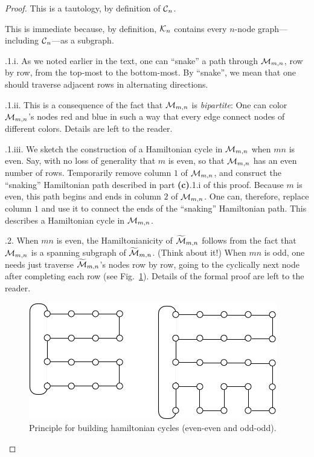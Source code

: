 \begin{proof}
This is a tautology, by definition of $\mbox{$\cal C$}_n$.

\medskip

This is immediate because, by definition, $\mbox{$\cal K$}_n$ contains every
$n$-node graph---including $\mbox{$\cal C$}_n$---as a subgraph.

\medskip

.1.i.
As we noted earlier in the text, one can ``snake'' a path through
$\mbox{$\cal M$}_{m,n}$, row by row, from the top-most to the bottom-most.  By
``snake'', we mean that one should traverse adjacent rows in
alternating directions.

.1.ii.
This is a consequence of the fact that $\mbox{$\cal M$}_{m,n}$ is {\it bipartite}:
 One can color $\mbox{$\cal M$}_{m,n}$'s nodes red and blue
in such a way that every edge connect nodes of different colors.
Details are left to the reader.

.1.iii.
We sketch the construction of a Hamiltonian cycle in $\mbox{$\cal M$}_{m,n}$ when
$mn$ is even.  Say, with no loss of generality that $m$ is even, so
that $\mbox{$\cal M$}_{m,n}$ has an even number of rows.  Temporarily remove column
$1$ of $\mbox{$\cal M$}_{m,n}$, and consruct the ``snaking'' Hamiltonian path
described in part {\bf (c)}.1.i of this proof.  Because $m$ is even,
this path begins and ends in column $2$ of $\mbox{$\cal M$}_{m,n}$.  One can,
therefore, replace column $1$ and use it to connect the ends of the
``snaking'' Hamiltonian path.  This describes a Hamiltonian cycle in
$\mbox{$\cal M$}_{m,n}$.

.2.
When $mn$ is even, the Hamiltonianicity of $\widetilde{\mbox{$\cal M$}}_{m,n}$
follows from the fact that $\mbox{$\cal M$}_{m,n}$ is a spanning subgraph of
$\widetilde{\mbox{$\cal M$}}_{m,n}$.  (Think about it!)  When $mn$ is odd, one
needs just traverse $\widetilde{\mbox{$\cal M$}}_{m,n}$'s nodes row by row, going
to the cyclically next node after completing each row (see Fig.~\ref{fig:HamiltonTorus}).  
Details of the formal proof are left to the reader.
\begin{figure}[hbt]
\begin{center}
       \includegraphics[scale=0.6]{FiguresGraph/HamiltonTorus}
       \caption{Principle for building hamiltonian cycles (even-even and odd-odd).}
  \label{fig:HamiltonTorus}
\end{center}
\end{figure}
\medskip


\end{proof}

